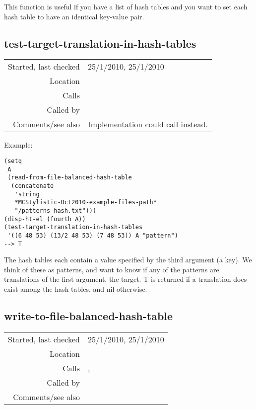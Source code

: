 \noindent This function is useful if you have a list
of hash tables and you want to set each hash table to
have an identical key-value pair.


\subsection*{test-target-translation-in-hash-tables}\label{fun:test-target-translation-in-hash-tables}

\vspace{0.3cm}
\begin{tabular}{r|p{8cm}}
Started, last checked & 25/1/2010, 25/1/2010 \\
Location & \nameref{sec:hash-tables} \\
Calls & \nameref{fun:test-translation} \\
Called by & \nameref{fun:number-of-targets-translation-in-hash-tables} \\
Comments/see also & Implementation could call \nameref{fun:index-target-translation-in-hash-tables} instead.
\end{tabular}

\vspace{0.5cm}
\noindent Example:
\begin{verbatim}
(setq
 A
 (read-from-file-balanced-hash-table
  (concatenate
   'string
   *MCStylistic-Oct2010-example-files-path*
   "/patterns-hash.txt")))
(disp-ht-el (fourth A))
(test-target-translation-in-hash-tables
 '((6 48 53) (13/2 48 53) (7 48 53)) A "pattern")
--> T
\end{verbatim}

\noindent The hash tables each contain a value
specified by the third argument (a key). We think of
these as patterns, and want to know if any of the
patterns are translations of the first argument, the
target. T is returned if a translation does exist
among the hash tables, and nil otherwise.


\subsection*{write-to-file-balanced-hash-table}\label{fun:write-to-file-balanced-hash-table}

\vspace{0.3cm}
\begin{tabular}{r|p{8cm}}
Started, last checked & 25/1/2010, 25/1/2010 \\
Location & \nameref{sec:hash-tables} \\
Calls & \nameref{fun:disp-ht-el}, \nameref{fun:write-to-file} \\
Called by & \\
Comments/see also &
\end{tabular}

